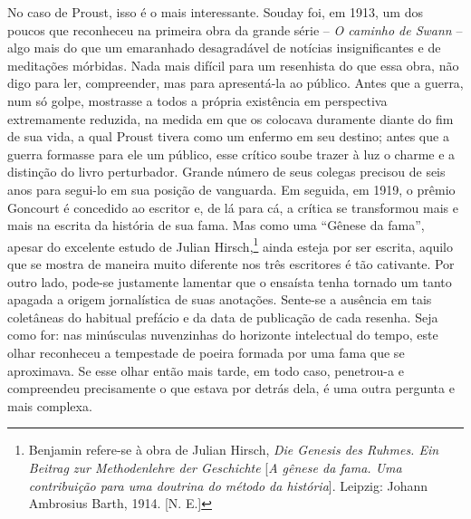 No caso de Proust, isso é o mais interessante. Souday foi, em 1913, um
dos poucos que reconheceu na primeira obra da grande série -- \emph{O
caminho de Swann} -- algo mais do que um emaranhado desagradável de
notícias insignificantes e de meditações mórbidas. Nada mais difícil
para um resenhista do que essa obra, não digo para ler, compreender, mas
para apresentá-la ao público. Antes que a guerra, num só golpe,
mostrasse a todos a própria existência em perspectiva extremamente
reduzida, na medida em que os colocava duramente diante do fim de sua
vida, a qual Proust tivera como um enfermo em seu destino; antes que a
guerra formasse para ele um público, esse crítico soube trazer à luz o
charme e a distinção do livro perturbador. Grande número de seus colegas
precisou de seis anos para segui-lo em sua posição de vanguarda. Em
seguida, em 1919, o prêmio Goncourt é concedido ao escritor e, de lá
para cá, a crítica se transformou mais e mais na escrita da história de
sua fama. Mas como uma ``Gênese da fama'', apesar do excelente estudo de
Julian Hirsch,\footnote{Benjamin refere-se à obra de Julian Hirsch,
  \emph{Die Genesis des Ruhmes. Ein Beitrag zur Methodenlehre der
  Geschichte} {[}\emph{A gênese da fama. Uma contribuição para uma
  doutrina do método da história}{]}. Leipzig: Johann Ambrosius Barth,
  1914. {[}N. E.{]}} ainda esteja por ser escrita, aquilo que se mostra
de maneira muito diferente nos três escritores é tão cativante. Por
outro lado, pode-se justamente lamentar que o ensaísta tenha tornado um
tanto apagada a origem jornalística de suas anotações. Sente-se a
ausência em tais coletâneas do habitual prefácio e da data de publicação
de cada resenha. Seja como for: nas minúsculas nuvenzinhas do horizonte
intelectual do tempo, este olhar reconheceu a tempestade de poeira
formada por uma fama que se aproximava. Se esse olhar então mais tarde,
em todo caso, penetrou-a e compreendeu precisamente o que estava por
detrás dela, é uma outra pergunta e mais complexa.

